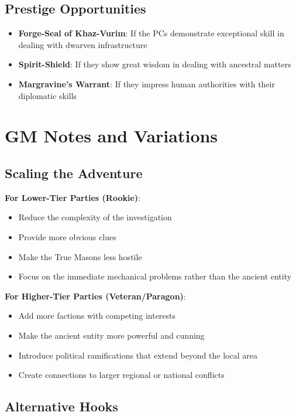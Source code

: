 \documentclass[11pt]{article}
\begin{document}
\subsection{Prestige Opportunities}

\begin{itemize}
\item \textbf{Forge-Seal of Khaz-Vurim}: If the PCs demonstrate exceptional skill in dealing with dwarven infrastructure
\item \textbf{Spirit-Shield}: If they show great wisdom in dealing with ancestral matters
\item \textbf{Margravine's Warrant}: If they impress human authorities with their diplomatic skills
\end{itemize}

\section{GM Notes and Variations}

\subsection{Scaling the Adventure}

\textbf{For Lower-Tier Parties (Rookie)}:
\begin{itemize}
\item Reduce the complexity of the investigation
\item Provide more obvious clues
\item Make the True Masons less hostile
\item Focus on the immediate mechanical problems rather than the ancient entity
\end{itemize}

\textbf{For Higher-Tier Parties (Veteran/Paragon)}:
\begin{itemize}
\item Add more factions with competing interests
\item Make the ancient entity more powerful and cunning
\item Introduce political ramifications that extend beyond the local area
\item Create connections to larger regional or national conflicts
\end{itemize}

\subsection{Alternative Hooks}
\end{document}
